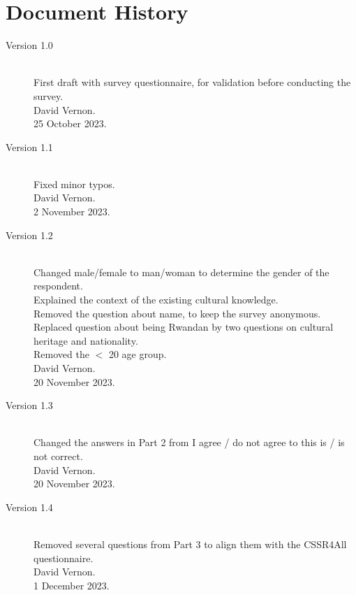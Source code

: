 \documentclass{CSSRforAfrica}
\begin{document}
  

\newpage
\section*{Document History}
\label{document_history}

\begin{description}

\item [Version 1.0]~\\
First draft with survey questionnaire, for validation before conducting the survey. \\
David  Vernon. \\                       
25 October 2023.                                               


\item [Version 1.1]~\\
Fixed minor typos. \\
David  Vernon. \\                       
2 November 2023.      

\item [Version 1.2]~\\
Changed male/female to man/woman to determine the gender of the respondent. \\
Explained the context of the existing cultural knowledge.\\
Removed the question about name, to keep the survey anonymous.\\
Replaced question about being Rwandan by two questions on cultural heritage and nationality.\\
Removed the $<$ 20 age group.\\
David  Vernon. \\                       
20 November 2023.   

\item [Version 1.3]~\\
Changed the answers in Part 2 from I agree / do not agree to this is / is not correct.\\
David  Vernon. \\                       
20 November 2023.   

\item [Version 1.4]~\\
Removed several questions from Part 3 to align them with the CSSR4All questionnaire.\\
David  Vernon. \\                       
1 December 2023.   



\end{description}
\end{document}
